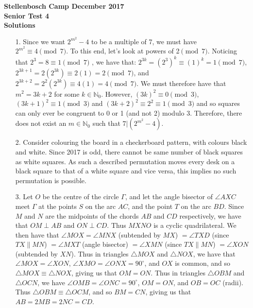 \documentclass[a4paper, 12pt]{article}
\begin{document}
\begin{center}
\textbf{Stellenbosch Camp December 2017 \\ Senior Test 4} \\
\textbf{Solutions}
\end{center}

\begin{enumerate}

    \item[1.] Since we want $2^{m^2}-4$ to be a multiple of 7, we must have $2^{m^2} \equiv 4 \pmod{7}$. To this end, let's look at powers of 2$\pmod{7}$. Noticing that $2^3=8\equiv 1 \pmod{7}$ , we have that: $2^{3k} = (2^3)^k \equiv (1)^k = 1 \pmod{7}$, $2^{3k+1} = 2(2^{3k}) \equiv 2(1) = 2 \pmod{7}$, and $2^{3k+2} = 2^2(2^{3k}) \equiv 4(1) = 4 \pmod{7}$. We must therefore have that $m^2 = 3k+2$ for some $k\in \mathbb{N}_0$. However, $(3k)^2\equiv 0 \pmod{3}$, $(3k+1)^2\equiv 1 \pmod{3}$ and $(3k+2)^2 \equiv 2^2 \equiv 1 \pmod{3}$ and so squares can only ever be congruent to 0 or 1 (and not 2) modulo 3. Therefore, there does not exist an $m\in \mathbb{N}_0$ such that $7|(2^{m^2}-4)$. 
    
    \item[2.] Consider colouring the board in a checkerboard pattern, with colours black and white. Since 2017 is odd, there cannot be same number of black squares as white squares. As such a described permutation moves every desk on a black square to that of a white square and vice versa, this implies no such permutation is possible.
    
    \item[3.] Let $O$ be the centre of the circle $\Gamma$, and let the angle
        bisector of $\angle AXC$ meet $\Gamma$ at the points $S$ on the arc
        $AC$, and the point $T$ on the arc $BD$.  Since $M$ and $N$
        are the midpoints of the chords $AB$ and $CD$ respectively, we have that
        $OM \perp AB$ and $ON \perp CD$. Thus $MXNO$ is a cyclic quadrilateral.
        We then have that $\angle MOX = \angle MNX$ (subtended by $MX$) $=
        \angle TXD$ (since $TX \parallel MN$) $= \angle MXT$ (angle bisector) $=
        \angle XMN$ (since $TX \parallel MN$) $= \angle XON$ (subtended by
        $XN$). Thus in triangles $\triangle MOX$ and $\triangle NOX$, we have that $\angle MOX =
        \angle XON$, $\angle XMO = \angle ONX = 90^\circ$, and $OX$ is common,
        and so $\triangle MOX \equiv \triangle NOX$, giving us that $OM = ON$.
        Thus in triangles $\triangle OBM$ and $\triangle OCN$, we have $\angle
        OMB = \angle ONC = 90^\circ$, $OM = ON$, and $OB = OC$ (radii). Thus
        $\triangle OBM \equiv \triangle OCM$, and so $BM = CN$, giving us that
        $AB = 2MB = 2NC = CD$.


\end{enumerate}
\end{document}
